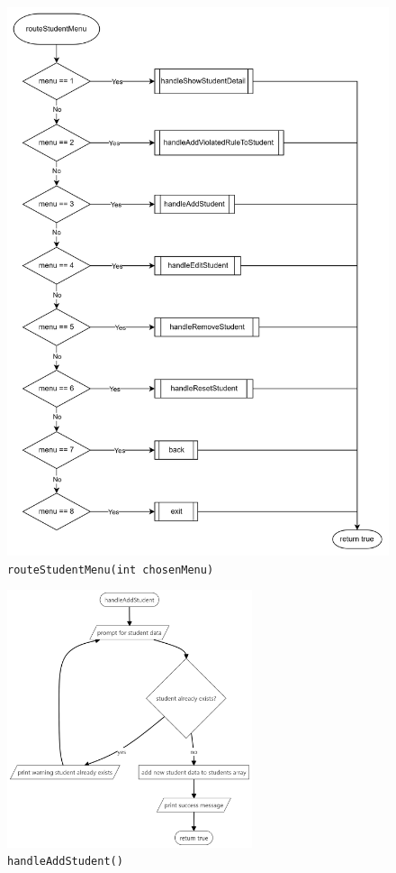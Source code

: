 \documentclass[12pt,titlepage]{article}
\begin{document}
\begin{figure}[h]
    \centering
    \includegraphics[width=.7\textwidth]{flowcharts/route-student-menu-drawio.png}
    \caption{\texttt{routeStudentMenu(int chosenMenu)}}
\end{figure}

\pagebreak

\begin{figure}[h]
    \centering
    \includegraphics[width=7.2cm]{flowcharts/handle-add-student.png}
    \caption{\texttt{handleAddStudent()}}
\end{figure}
\end{document}
